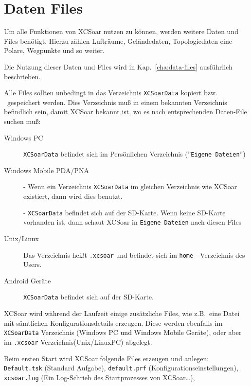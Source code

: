 \section{Daten Files}\label{InstallationDatenfiles}

Um alle Funktionen von {\textsf  XCSoar} nutzen zu können, werden weitere Daten und Files benötigt.
Hierzu zählen Lufträume, Geländedaten, Topologiedaten eine Polare, Wegpunkte und so weiter. 


Die Nutzung dieser Daten und Files wird in Kap.~\ref{cha:data-files} ausführlich beschrieben. 

Alle Files sollten unbedingt in das Verzeichnis \texttt{XCSoarData} kopiert bzw. \ gespeichert werden. 
Dies Verzeichnis muß  in einem bekannten Verzeichnis befindlich sein, damit {\textsf  XCSoar} bekannt ist, wo es nach entsprechenden 
Daten-File suchen muß: 

 
\begin{description}
\item[Windows PC]
\texttt{XCSoarData} befindet sich im Persönlichen Verzeichnis (''\texttt{Eigene Dateien}'')
\item[Windows Mobile PDA/PNA]
- Wenn ein Verzeichnis \texttt{XCSoarData} im gleichen Verzeichnis wie {\textsf  XCSoar} existiert, dann wird dies benutzt.  


- \texttt{XCSoarData} befindet sich auf der SD-Karte.  Wenn keine SD-Karte vorhanden ist, dann schaut {\textsf  XCSoar} in \texttt{Eigene Dateien} nach diesen Files

\item[Unix/Linux]
Das Verzeichnis heißt \verb|.xcsoar| und befindet sich im \verb|home| - Verzeichnis des Users. 
\item[Android Geräte]
\texttt{XCSoarData} befindet sich auf der SD-Karte.
\end{description}


{\textsf  XCSoar} wird während der Laufzeit einige zusätzliche Files, wie z.B.\ eine Datei mit sämtlichen Konfigurationsdetails erzeugen.
Diese werden ebenfalls im \texttt{XCSoarData} Verzeichnis (Windows PC und Windows Mobile Geräte), oder aber im \texttt{.xcsoar} 
Verzeichnis(Unix/LinuxPC) abgelegt. 

Beim ersten Start wird {\textsf  XCSoar}  folgende Files erzeugen und anlegen: 
\texttt{Default.tsk} (Standard Aufgabe),  \texttt{default.prf} (Konfigurationseinstellungen), \texttt{xcsoar.log} 
(Ein Log-Schrieb des Startprozesses von {\textsf  XCSoar}\dots), 



